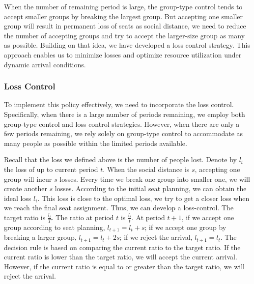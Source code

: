 

When the number of remaining period is large, the group-type control tends to accept smaller groups by breaking the largest group. But accepting one smaller group will result in permanent loss of seats as social distance, we need to reduce the number of accepting groups and try to accept the larger-size group as many as possible. Building on that idea, we have developed a loss control strategy. This approach enables us to minimize losses and optimize resource utilization under dynamic arrival conditions.

\subsubsection{Loss Control}
To implement this policy effectively, we need to incorporate the loss control. Specifically, when there is a large number of periods remaining, we employ both group-type control and loss control strategies. However, when there are only a few periods remaining, we rely solely on group-type control to accommodate as many people as possible within the limited periods available.

Recall that the loss we defined above is the number of people lost. Denote by $l_{t}$ the loss of up to current period $t$. When the social distance is $s$, accepting one group will incur $s$ losses. Every time we break one group into smaller one, we will create another $s$ losses. According to the initial seat planning, we can obtain the ideal loss $l_{i}$. This loss is close to the optimal loss, we try to get a closer loss when we reach the final seat assignment. Thus, we can develop a loss-control. The target ratio is $\frac{l_{i}}{T}$. The ratio at period $t$ is $\frac{l_{t}}{t}$. At period $t+1$, if we accept one group according to seat planning, $l_{t+1} = l_{t} + s$; if we accept one group by breaking a larger group, $l_{t+1} = l_{t} + 2s$; if we reject the arrival, $l_{t+1} = l_{t}$. The decision rule is based on comparing the current ratio to the target ratio. If the current ratio is lower than the target ratio, we will accept the current arrival. However, if the current ratio is equal to or greater than the target ratio, we will reject the arrival.


